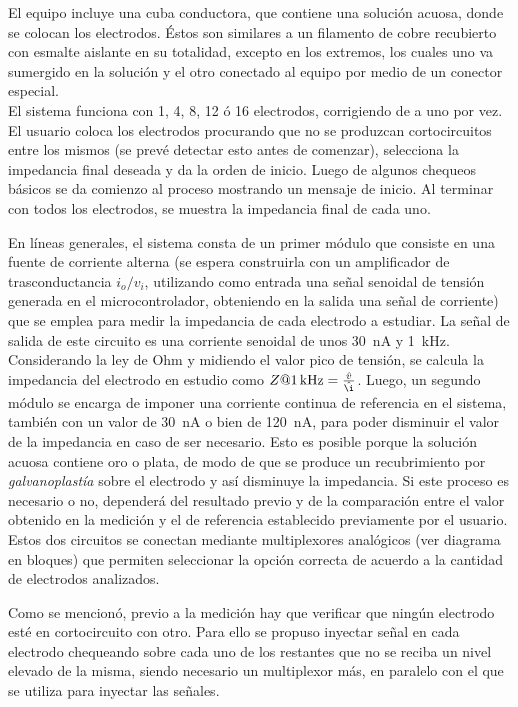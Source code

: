 El equipo incluye una cuba conductora, que contiene una solución acuosa, donde se colocan los electrodos. Éstos son similares a un filamento de cobre recubierto con esmalte aislante en su totalidad, excepto en los extremos, los cuales uno va sumergido en la solución y el otro conectado al equipo por medio de un conector especial.\\

El sistema funciona con 1, 4, 8, 12 ó 16 electrodos, corrigiendo de a uno por vez. El usuario coloca los electrodos procurando que no se produzcan cortocircuitos entre los mismos (se prevé detectar esto antes de comenzar), selecciona la impedancia final deseada y da la orden de inicio. Luego de algunos chequeos básicos se da comienzo al proceso mostrando un mensaje de inicio. Al terminar con todos los electrodos, se muestra la impedancia final de cada uno. 

En líneas generales, el sistema consta de un primer módulo que consiste en una fuente de corriente alterna (se espera construirla con un amplificador de trasconductancia $i_o/v_i$, utilizando como entrada una señal senoidal de tensión generada en el microcontrolador, obteniendo en la salida una señal de corriente) que se emplea para medir la impedancia de cada electrodo a estudiar. La señal de salida de este circuito es una corriente senoidal de unos \SI{30}{\nano\ampere} y \SI{1}{\kilo\hertz}. Considerando la ley de Ohm y midiendo el valor pico de tensión, se calcula la impedancia del electrodo en estudio como $Z@\SI{1}{\kilo\hertz} = \frac{\hat{v}}{\hat{\i}}$. Luego, un segundo módulo se encarga de imponer una corriente continua de referencia en el sistema, también con un valor de \SI{30}{\nano\ampere} o bien de \SI{120}{\nano\ampere}, para poder disminuir el valor de la impedancia en caso de ser necesario. Esto es posible porque la solución acuosa contiene oro o plata, de modo de que se produce un recubrimiento por \emph{galvanoplastía} sobre el electrodo y así disminuye la impedancia. Si este proceso es necesario o no, dependerá del resultado previo y de la comparación entre el valor obtenido en la medición y el de referencia establecido previamente por el usuario. Estos dos circuitos se conectan mediante multiplexores analógicos (ver diagrama en bloques) que permiten seleccionar la opción correcta de acuerdo a la cantidad de electrodos analizados. 

Como se mencionó, previo a la medición hay que verificar que ningún electrodo esté en cortocircuito con otro. Para ello se propuso inyectar señal en cada electrodo chequeando sobre cada uno de los restantes que no se reciba un nivel elevado de la misma, siendo necesario un multiplexor más, en paralelo con el que se utiliza para inyectar las señales.

